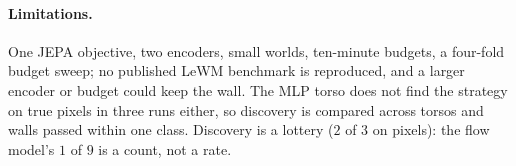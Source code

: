 \paragraph{Limitations.} One JEPA objective, two encoders, small worlds, ten-minute budgets, a four-fold budget sweep; no published LeWM benchmark is reproduced, and a larger encoder or budget could keep the wall. The MLP torso does not find the strategy on true pixels in three runs either, so discovery is compared across torsos and walls passed within one class. Discovery is a lottery ($2$ of $3$ on pixels): the flow model's $1$ of $9$ is a count, not a rate.
